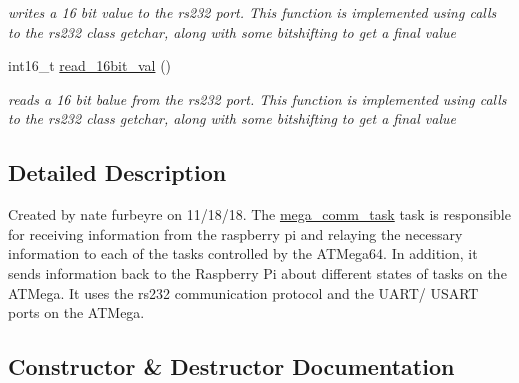 \begin{DoxyCompactItemize}
\begin{DoxyCompactList}\small\item\em writes a 16 bit value to the rs232 port. This function is implemented using calls to the rs232 class getchar, along with some bitshifting to get a final value \end{DoxyCompactList}\item 
int16\+\_\+t \hyperlink{classmega__comm__task_a04be72195bd2071fe1eb51b2ac5bbe1f}{read\+\_\+16bit\+\_\+val} ()\hypertarget{classmega__comm__task_a04be72195bd2071fe1eb51b2ac5bbe1f}{}\label{classmega__comm__task_a04be72195bd2071fe1eb51b2ac5bbe1f}

\begin{DoxyCompactList}\small\item\em reads a 16 bit balue from the rs232 port. This function is implemented using calls to the rs232 class getchar, along with some bitshifting to get a final value \end{DoxyCompactList}\end{DoxyCompactItemize}


\subsection{Detailed Description}
Created by nate furbeyre on 11/18/18. The \hyperlink{classmega__comm__task}{mega\+\_\+comm\+\_\+task} task is responsible for receiving information from the raspberry pi and relaying the necessary information to each of the tasks controlled by the A\+T\+Mega64. In addition, it sends information back to the Raspberry Pi about different states of tasks on the A\+T\+Mega. It uses the rs232 communication protocol and the U\+A\+R\+T/ U\+S\+A\+RT ports on the A\+T\+Mega. 

\subsection{Constructor \& Destructor Documentation}
